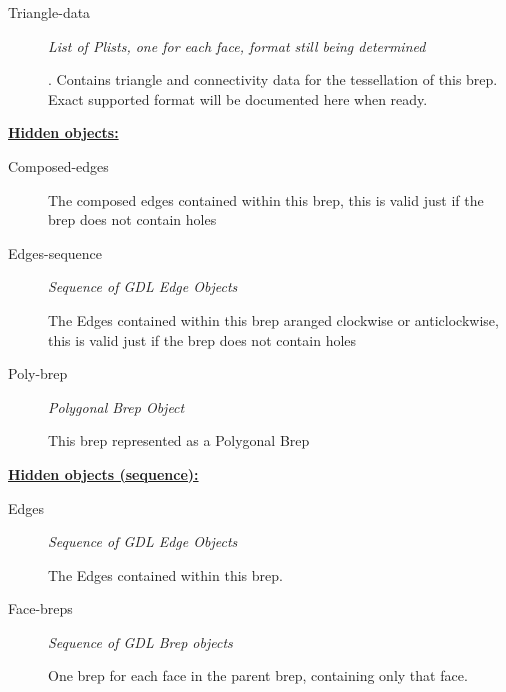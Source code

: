 \documentclass [11pt]{book}
\begin{document}
\begin{itemize}
\begin{description}
\item [Triangle-data]
\emph{List of Plists, one for each face, format still being determined}

.
Contains triangle and connectivity data for the tessellation
of this brep. Exact supported format will be documented here when ready.




\end{description}






\textbf{
\underline{Hidden objects:}}

\begin{description}

\item [Composed-edges]

The composed edges contained within this brep, this is valid just if the brep does not contain holes




\item [Edges-sequence]
\emph{Sequence of GDL Edge Objects}

 The Edges contained within this brep aranged clockwise or anticlockwise,
this is valid just if the brep does not contain holes




\item [Poly-brep]
\emph{Polygonal Brep Object}

 This brep represented as a Polygonal Brep




\end{description}






\textbf{
\underline{Hidden objects (sequence):}}

\begin{description}

\item [Edges]
\emph{Sequence of GDL Edge Objects}

 The Edges contained within this brep.




\item [Face-breps]
\emph{Sequence of GDL Brep objects}

 One brep for each face in the parent brep, containing only that face.





\end{description}
\end{itemize}
\end{document}
